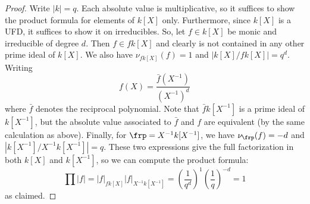 \begin{proof}
	Write $|k| = q$. Each absolute value is multiplicative, so it suffices to show the product formula for elements of $k[X]$ only. Furthermore, since $k[X]$ is a UFD, it suffices to show it on irreducibles. So, let $f \in k[X]$ be monic and irreducible of degree $d$. Then $f \in fk[X]$ and clearly is not contained in any other prime ideal of $k[X]$. We also have $\nu_{fk[X]}(f) = 1$ and $|k[X]/fk[X]| = q^d$. Writing
	\[ f(X) = \frac{\bar{f}(X^{-1})}{(X^{-1})^d} \]
	where $\bar{f}$ denotes the reciprocal polynomial. Note that $\bar{f}k[X^{-1}]$ is a prime ideal of $k[X^{-1}]$, but the absolute value associated to $\bar{f}$ and $f$ are equivalent (by the same calculation as above). Finally, for $\frp = X^{-1}k[X^{-1}]$, we have $\nu_\frp(f) = -d$ and $|k[X^{-1}]/X^{-1}k[X^{-1}]| = q$. These two expressions give the full factorization in both $k[X]$ and $k[X^{-1}]$, so we can compute the product formula:
	\[ \prod |f| = |f|_{fk[X]}|f|_{X^{-1}k[X^{-1}]} = \left(\frac{1}{q^d}\right)^1\left(\frac{1}{q}\right)^{-d} = 1 \]
	as claimed.
\end{proof}

